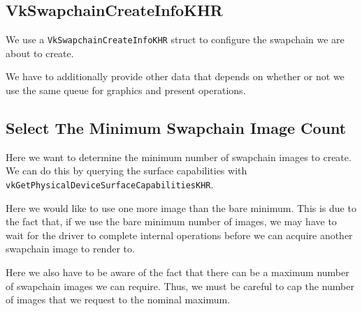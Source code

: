\subsection{VkSwapchainCreateInfoKHR}

We use a \texttt{VkSwapchainCreateInfoKHR} struct to configure the swapchain we are
about to create.

\begin{minipage}{\linewidth}{\noindent}
    
\end{minipage}

We have to additionally provide other data that depends on whether or not we use
the same queue for graphics and present operations.

\begin{minipage}{\linewidth}{\noindent}
    
\end{minipage}

\subsection{Select The Minimum Swapchain Image Count}

Here we want to determine the minimum number of swapchain images to create.
We can do this by querying the surface capabilities with
\texttt{vkGetPhysicalDeviceSurfaceCapabilitiesKHR}.

\begin{minipage}{\linewidth}{\noindent}
    
\end{minipage}

Here we would like to use one more image than the bare minimum.
This is due to the fact that, if we use the bare minimum number of images,
we may have to wait for the driver to complete internal operations before
we can acquire another swapchain image to render to.

Here we also have to be aware of the fact that there can be a maximum number of
swapchain images we can require.
Thus, we must be careful to cap the number of images that
we request to the nominal maximum.

